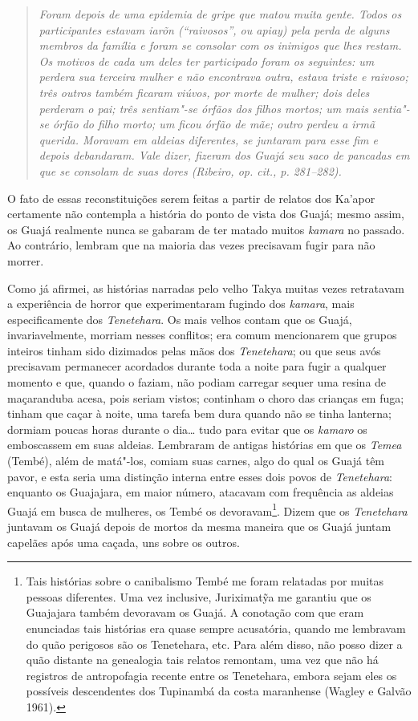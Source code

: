 \begin{quote}
\emph{Foram depois de uma epidemia de gripe que matou muita gente. Todos os
participantes estavam \emph{iarõn} (``raivosos'', ou \emph{apiay}) pela
perda de alguns membros da família e foram se consolar com os inimigos
que lhes restam. Os motivos de cada um deles ter participado foram os
seguintes: um perdera sua terceira mulher e não encontrava outra, estava
triste e raivoso; três outros também ficaram viúvos, por morte de
mulher; dois deles perderam o pai; três sentiam"-se órfãos dos filhos
mortos; um mais sentia"-se órfão do filho morto; um ficou órfão de mãe;
outro perdeu a irmã querida. Moravam em aldeias diferentes, se juntaram
para esse fim e depois debandaram. Vale dizer, fizeram dos Guajá seu
saco de pancadas em que se consolam de suas dores (Ribeiro, \emph{op. cit.},
p. 281--282).}
\end{quote}

O fato de essas reconstituições serem feitas a partir de relatos dos
Ka'apor certamente não contempla a história do ponto de vista dos Guajá;
mesmo assim, os Guajá realmente nunca se gabaram de ter matado muitos
\emph{kamara} no passado. Ao contrário, lembram que na maioria das vezes
precisavam fugir para não morrer.

Como já afirmei, as histórias narradas pelo velho Takya muitas vezes
retratavam a experiência de horror que experimentaram fugindo dos
\emph{kamara}, mais especificamente dos \emph{Tenetehara}. Os mais
velhos contam que os Guajá, invariavelmente, morriam nesses conflitos;
era comum mencionarem que grupos inteiros tinham sido dizimados pelas
mãos dos \emph{Tenetehara}; ou que seus avós precisavam permanecer
acordados durante toda a noite para fugir a qualquer momento e que,
quando o faziam, não podiam carregar sequer uma resina de maçaranduba
acesa, pois seriam vistos; continham o choro das crianças em fuga;
tinham que caçar à noite, uma tarefa bem dura quando não se tinha
lanterna; dormiam poucas horas durante o dia\ldots{} tudo para evitar que os
\emph{kamaro} os emboscassem em suas aldeias. Lembraram de antigas
histórias em que os \emph{Temea} (Tembé), além de matá"-los, comiam suas
carnes, algo do qual os Guajá têm pavor, e esta seria uma distinção
interna entre esses dois povos de \emph{Tenetehara}: enquanto os
Guajajara, em maior número, atacavam com frequência as aldeias Guajá em
busca de mulheres, os Tembé os devoravam\footnote{Tais histórias sobre o
  canibalismo Tembé me foram relatadas por muitas pessoas diferentes.
  Uma vez inclusive, Juriximatỹa me garantiu que os Guajajara também
  devoravam os Guajá. A conotação com que eram enunciadas tais histórias
  era quase sempre acusatória, quando me lembravam do quão perigosos são
  os Tenetehara, etc. Para além disso, não posso dizer a quão distante
  na genealogia tais relatos remontam, uma vez que não há registros de
  antropofagia recente entre os Tenetehara, embora sejam eles os
  possíveis descendentes dos Tupinambá da costa maranhense (Wagley e
  Galvão 1961).}. Dizem que os \emph{Tenetehara} juntavam os Guajá
depois de mortos da mesma maneira que os Guajá juntam capelães após uma
caçada, uns sobre os outros.

